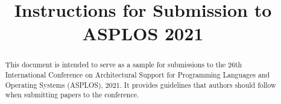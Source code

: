 \documentclass[pageno]{jpaper}
\begin{document}
\title{
Instructions for Submission to ASPLOS 2021}

\date{}
\maketitle

\thispagestyle{empty}

\begin{abstract}

This document is intended to serve as a sample for submissions to the
26th International Conference on Architectural Support for Programming
Languages and Operating Systems (ASPLOS), 2021.  It provides
guidelines that authors should follow when submitting papers to the
conference. 
\end{abstract}















\end{document}
